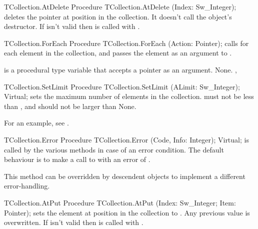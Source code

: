\begin{procedure}{TCollection.AtDelete}
\Declaration
Procedure TCollection.AtDelete (Index: Sw\_Integer);
\Description
{} deletes the pointer at position  in the
collection. It doesn't call the object's destructor.
\Errors
If  isn't valid then  is called
with .
\SeeAlso
{}
\end{procedure}




\begin{procedure}{TCollection.ForEach}
\Declaration
Procedure TCollection.ForEach (Action: Pointer);
\Description
{} calls  for each element in the collection,
and passes the element as an argument to .

 is a procedural type variable that accepts a pointer as an 
argument.
\Errors
None.
\SeeAlso
{}, 
\end{procedure}



\begin{procedure}{TCollection.SetLimit}
\Declaration
Procedure TCollection.SetLimit (ALimit: Sw\_Integer); Virtual;
\Description
{} sets the maximum number of elements in the collection.
 must not be less than , and should not be larger
than 
\Errors
None.
\SeeAlso
{}
\end{procedure}

For an example, see .

\begin{procedure}{TCollection.Error}
\Declaration
Procedure TCollection.Error (Code, Info: Integer); Virtual;
\Description
{} is called by the various  methods
in case of an error condition. The default behaviour is to make
a call to  with an error of .

This method can be overridden by descendent objects to implement
a different error-handling.
\Errors
\SeeAlso
{}
\end{procedure}

\begin{procedure}{TCollection.AtPut}
\Declaration
Procedure TCollection.AtPut (Index: Sw\_Integer; Item: Pointer);
\Description
{} sets the element at position  in the collection
to . Any previous value is overwritten.
\Errors
If  isn't valid then  is called
with .
\SeeAlso
\end{procedure}


